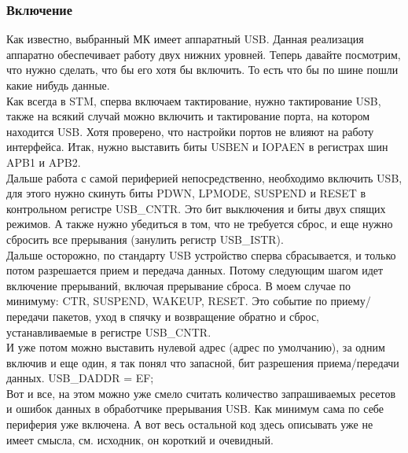 \documentclass[12pt,a4paper]{article}
\begin{document}
\subsubsection{Включение}
    Как известно, выбранный МК имеет аппаратный USB. Данная реализация аппаратно
    обеспечивает работу двух нижних уровней. Теперь давайте посмотрим,
    что нужно сделать, что бы его хотя бы включить. То есть что бы по шине пошли
    какие нибудь данные.\\
    Как всегда в STM, сперва включаем тактирование, нужно тактирование USB,
    также на всякий случай можно включить и тактирование порта, на котором
    находится USB. Хотя проверено, что настройки портов не влияют на работу
    интерфейса. Итак, нужно выставить биты USBEN и IOPAEN в регистрах шин APB1 и APB2.\\
    Дальше работа с самой периферией непосредственно, необходимо включить USB,
    для этого нужно скинуть биты PDWN, LPMODE, SUSPEND и RESET в контрольном
    регистре USB\_CNTR. Это бит выключения и биты двух спящих режимов.
    А также нужно убедиться в том, что не требуется сброс, и еще нужно сбросить все
    прерывания (занулить регистр USB\_ISTR).\\
    Дальше осторожно, по стандарту USB устройство сперва
    сбрасывается, и только потом разрешается прием и передача данных. Потому
    следующим шагом идет включение прерываний, включая прерывание сброса.
    В моем случае по минимуму: CTR, SUSPEND,
    WAKEUP, RESET. Это событие по приему/передачи пакетов, уход в спячку и
    возвращение обратно и сброс, устанавливаемые в регистре USB\_CNTR.\\
    И уже потом можно выставить нулевой адрес (адрес по умолчанию), за одним
    включив и еще один, я так понял что запасной, бит разрешения приема/передачи
    данных. USB\_DADDR = EF;\\
    Вот и все, на этом можно уже смело считать количество запрашиваемых
    ресетов и ошибок данных в обработчике прерывания USB.
    Как минимум сама по себе периферия уже включена. А вот весь остальной код
    здесь описывать уже не имеет смысла, см. исходник, он короткий и очевидный.
\end{document}
